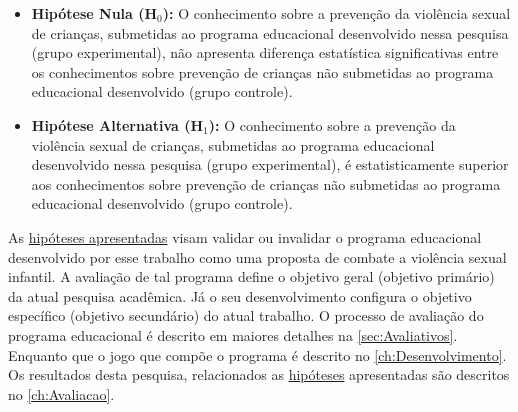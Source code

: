 \label{hipotese}
\begin{itemize}

	\item \textbf{Hipótese Nula (H$_{0}$):} O conhecimento sobre a prevenção da violência sexual de crianças, submetidas ao programa educacional desenvolvido nessa pesquisa (grupo experimental), não apresenta diferença estatística significativas entre os conhecimentos sobre prevenção de crianças não submetidas ao programa educacional desenvolvido (grupo controle).
	
	\item \textbf{Hipótese Alternativa (H$_{1}$):} O conhecimento sobre a prevenção da violência sexual de crianças, submetidas ao programa educacional desenvolvido nessa pesquisa (grupo experimental), é estatisticamente superior aos conhecimentos sobre prevenção de crianças não submetidas ao programa educacional desenvolvido (grupo controle). 
\end{itemize}




As \hyperref[hipotese]{hipóteses apresentadas} visam validar ou invalidar o programa educacional desenvolvido por esse trabalho como uma proposta de combate a violência sexual infantil. A avaliação de tal programa define o objetivo geral (objetivo primário) da atual pesquisa acadêmica. Já o seu desenvolvimento configura o objetivo específico (objetivo secundário) do atual trabalho. O processo de avaliação do programa educacional é descrito em maiores detalhes na \autoref{sec:Avaliativos}. Enquanto que o jogo que compõe o programa é descrito no \autoref{ch:Desenvolvimento}. Os resultados desta pesquisa, relacionados as \hyperref[hipotese]{hipóteses} apresentadas são descritos no \autoref{ch:Avaliacao}.

